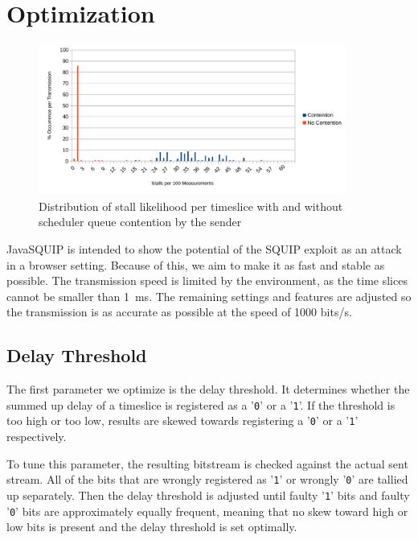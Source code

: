 \documentclass[11pt,
  titlepage=false,
  parskip=half,      %
]{scrreprt}
\begin{document}
\chapter{Optimization}
\label{ch:optimization}
\begin{figure}
\centering
\includegraphics[width=0.9\textwidth]{figures/contentionhistogram}

\caption{Distribution of stall likelihood per timeslice with and without scheduler queue contention by the sender}
\label{fig:contentionhistogram}
\end{figure}

JavaSQUIP is intended to show the potential of the SQUIP exploit as an attack in a browser setting.
Because of this, we aim to make it as fast and stable as possible.
The transmission speed is limited by the environment, as the time slices cannot be smaller than 1~ms.
The remaining settings and features are adjusted so the transmission is as accurate as possible at the speed of 1000 bits/s.


\section{Delay Threshold}
\label{sec:delaythreshold}

The first parameter we optimize is the delay threshold.
It determines whether the summed up delay of a timeslice is registered as a '\texttt{0}' or a '\texttt{1}'.
If the threshold is too high or too low, results are skewed towards registering a '\texttt{0}' or a '\texttt{1}' respectively.

To tune this parameter, the resulting bitstream is checked against the actual sent stream.
All of the bits that are wrongly registered as '\texttt{1}' or wrongly '\texttt{0}' are tallied up separately.
Then the delay threshold is adjusted until faulty '\texttt{1}' bits and faulty '\texttt{0}' bits are approximately equally frequent,
meaning that no skew toward high or low bits is present and the delay threshold is set optimally.
\end{document}
